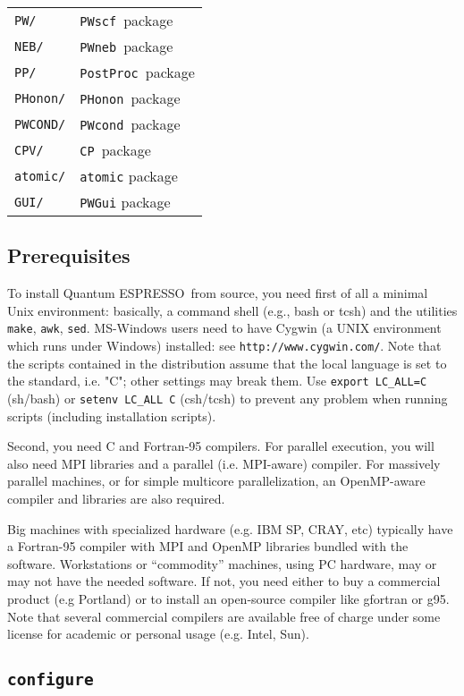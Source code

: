 \documentclass[12pt,a4paper]{article}
\def\qe{{\sc Quantum ESPRESSO}}
\def\configure{\texttt{configure}}
\def\PWscf{\texttt{PWscf}}
\def\PHonon{\texttt{PHonon}}
\def\CP{\texttt{CP}}
\def\PostProc{\texttt{PostProc}}
\def\NEB{\texttt{PWneb}} %
\def\make{\texttt{make}}
\begin{document}
\begin{tabular}{ll}
\texttt{PW/}      & \PWscf\ package\\
\texttt{NEB/}     & \NEB\ package\\
\texttt{PP/}      & \PostProc\ package\\
\texttt{PHonon/}  & \PHonon\ package\\
\texttt{PWCOND/}  & \texttt{PWcond}\ package\\
\texttt{CPV/}     & \CP\ package\\
\texttt{atomic/}  & \texttt{atomic} package\\
\texttt{GUI/}     & \texttt{PWGui} package\
\end{tabular}

\subsection{Prerequisites}
\label{Sec:Installation}

To install \qe\ from source, you need first of all a minimal Unix 
environment: basically, a command shell (e.g.,
bash or tcsh) and the utilities \make, \texttt{awk}, \texttt{sed}.
 MS-Windows users need to have Cygwin (a UNIX environment which
 runs under Windows) installed:
see \texttt{http://www.cygwin.com/}. Note that the scripts contained 
in the distribution assume that the local  language is set to the 
standard, i.e. "C"; other settings 
may break them. Use \texttt{export LC\_ALL=C} (sh/bash) or
\texttt{setenv LC\_ALL C} (csh/tcsh) to prevent any problem 
when running scripts (including installation scripts).

Second, you need C and Fortran-95 compilers. For parallel 
execution, you will also need MPI libraries and a parallel
(i.e. MPI-aware) compiler. For massively parallel machines, or 
for simple multicore parallelization, an OpenMP-aware compiler
and libraries are also required.

Big machines with
specialized hardware (e.g. IBM SP, CRAY, etc) typically have a
Fortran-95 compiler with MPI and OpenMP libraries bundled with 
the software. Workstations or ``commodity'' machines, using PC 
hardware, may or may not have the needed software. If not, you need 
either to buy a commercial product (e.g Portland) or to install
an open-source compiler like gfortran or g95. 
Note that several commercial compilers are available free of charge
under some license for academic or personal usage (e.g. Intel, Sun). 

\subsection{\configure}
\end{document}

